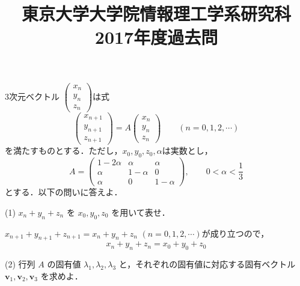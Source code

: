 \documentclass[a4j]{jarticle}
\title{東京大学大学院情報理工学系研究科2017年度過去問}
\author{}
\date{}
\begin{document}
\thispagestyle{empty}
\maketitle
\pagebreak

\section{}

\begin{screen}
 3次元ベクトル $\begin{pmatrix} x_n \\ y_n \\ z_n \end{pmatrix}$は式
 $$\begin{pmatrix} x_{n+1} \\ y_{n+1} \\ z_{n+1} \end{pmatrix} = A\begin{pmatrix} x_n \\ y_n \\ z_n \end{pmatrix} \quad\quad (n=0,1,2,\cdots)$$
 を満たすものとする．ただし，$x_0,y_0,z_0,\alpha$は実数とし，
 $$A=
 \begin{pmatrix}
  1 - 2\alpha & \alpha & \alpha \\
  \alpha & 1-\alpha & 0 \\
  \alpha &  0 & 1-\alpha
 \end{pmatrix}, \quad\quad 0<\alpha < \frac{1}{3}$$
 とする．以下の問いに答えよ．
\end{screen}


\begin{screen}
 (1) $x_n+y_n+z_n$ を $x_0,y_0,z_0$ を用いて表せ．
\end{screen}

$x_{n+1}+y_{n+1}+z_{n+1} = x_n + y_n + z_n$ $(n=0,1,2,\cdots)$が成り立つので，
$$x_n + y_n + z_n = x_0 + y_0 + z_0$$

\begin{screen}
 (2) 行列 $A$ の固有値 $\lambda_1,\lambda_2,\lambda_3$ と，それぞれの固有値に対応する固有ベクトル $\bm{v}_1,\bm{v}_2,\bm{v}_3$ を求めよ．
\end{screen}
\end{document}
